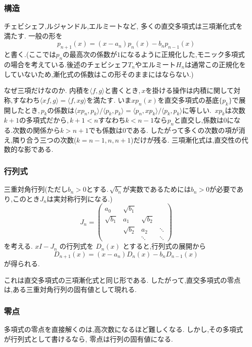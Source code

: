\subsubsection{構造}

チェビシェフ,ルジャンドル,エルミートなど,
多くの直交多項式は三項漸化式を満たす.
一般の形を
\[
  p_{n+1}(x)
  =(x-a_n)p_n(x)-b_np_{n-1}(x)
\]
と書く.(ここでは$p_n$の最高次の係数が$1$になるように正規化した,モニック多項式の場合を考えている.後述のチェビシェフ$T_n$やエルミート$H_n$は通常この正規化をしていないため,漸化式の係数はこの形そのままにはならない.)

なぜ三項だけなのか.
内積を$\langle f,g\rangle$と書くとき,\,$x$を掛ける操作は内積に関して対称,すなわち$\langle xf,g\rangle=\langle f,xg\rangle$を満たす.
いま$xp_n(x)$を直交多項式の基底$\{p_k\}$で展開したとき,\,$p_k$の係数は$\langle xp_n,p_k\rangle/\langle p_k,p_k\rangle=\langle p_n,xp_k\rangle/\langle p_k,p_k\rangle$に等しい.
\,$xp_k$は次数$k+1$の多項式だから,\,$k+1<n$すなわち$k<n-1$なら$p_n$と直交し,係数は$0$になる.次数の関係から$k>n+1$でも係数は$0$である.
したがって多くの次数の項が消え,隣り合う三つの次数($k=n-1,n,n+1$)だけが残る.
三項漸化式は,直交性の代数的な影である.

\subsubsection{行列式}

三重対角行列(ただし$b_n>0$とする.\,$\sqrt{b_n}$が実数であるためには$b_n>0$が必要であり,このとき$J_n$は実対称行列になる.)
\[
  J_n=
  \begin{pmatrix}
    a_0&\sqrt{b_1}&&\\
    \sqrt{b_1}&a_1&\sqrt{b_2}&\\
    &\sqrt{b_2}&a_2&\ddots\\
    &&\ddots&\ddots
  \end{pmatrix}
\]
を考える.
$xI-J_n$ の行列式を $D_n(x)$ とすると,行列式の展開から
\[
  D_{n+1}(x)
  =(x-a_n)D_n(x)-b_nD_{n-1}(x)
\]
が得られる.

これは直交多項式の三項漸化式と同じ形である.
したがって,直交多項式の零点は,ある三重対角行列の固有値として現れる.

\subsubsection{零点}

多項式の零点を直接解くのは,高次数になるほど難しくなる.
しかし,その多項式が行列式として書けるなら,
零点は行列の固有値になる.

